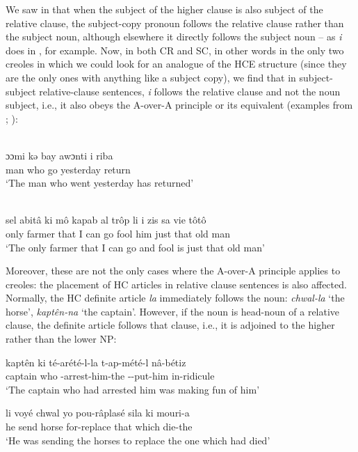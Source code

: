 We saw in  that when the subject of the higher clause is also subject of the relative clause, the subject-copy pronoun follows the relative clause rather than the subject noun, although elsewhere it directly follows the subject noun -- as \textit{i} does in , for example. Now, in both CR and SC, in other words in the only two creoles in which we could look for an analogue of the HCE structure (since they are the only ones with anything like a subject copy), we find that in subject-subject relative-clause sentences, \textit{i} follows the relative clause and not the noun subject, i.e., it also obeys the A-over-A principle or its equivalent (examples from \citealt[30]{Wilson1962}; \citealt[53]{Corne1977}):

\ea\label{ex:2:48}
\langinfo{\langCR}{}{}\\
 \gll ɔɔmi kə bay awɔnti i riba\\
man who go yesterday {\PM} return\\
\glt `The man who went yesterday has returned'
\z

\ea\label{ex:2:49}
\langinfo{\langSC}{}{}\\
 \gll sel abit{\^a} ki m{\^o} kapab al tr{\^o}p li i zis sa vie t{\^o}t{\^o}\\
 only farmer that I can go fool him {\PM} just that old man  \\
\glt `The only farmer that I can go and fool is just that old man'
\z

Moreover, these are not the only cases where the A-over-A principle applies to creoles: the placement of HC articles in relative\-
clause sentences is also affected. Normally, the HC definite article \textit{la} immediately follows the noun: \textit{chwal-la} `the horse', \textit{kapt{\^e}n-na} `the captain'. However, if the noun is head-noun of a relative clause, the definite article follows that clause, i.e., it is adjoined to the higher rather than the lower NP:

\ea\label{ex:2:50}
\gll kapt{\^e}n ki té-arété-l-la t-ap-mété-l n{\^a}-bétiz\\
captain who \TNS-arrest-him-the \TNS-\ASP-put-him in-ridicule\\
\glt  `The captain who had arrested him was making fun of him'
\z

\ea\label{ex:2:51}
 \gll li voyé chwal yo pou-r{\^a}plasé sila ki mouri-a\\
he send horse {\PL} for-replace that which die-the\\
\glt `He was sending the horses to replace the one which had died'
\z

